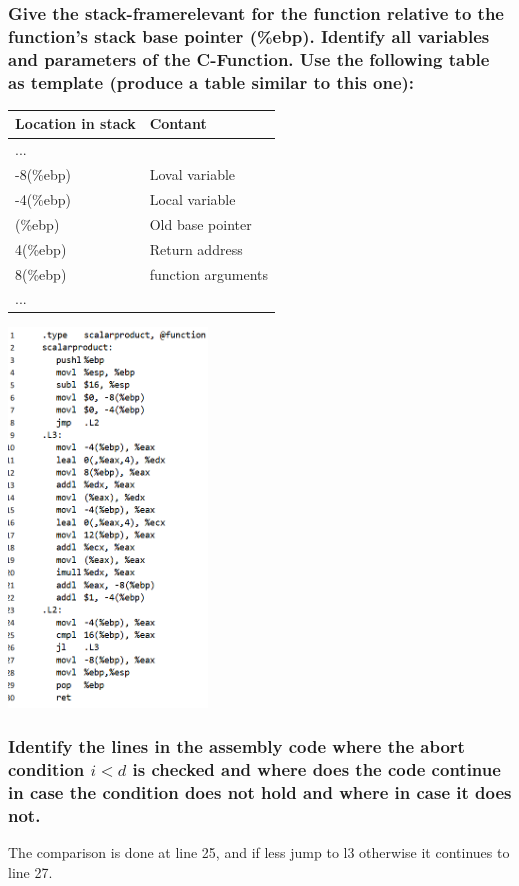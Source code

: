 \documentclass[12pt, a4paper]{article}
\begin{document}
			\subsubsection{Give  the stack-framerelevant for the function relative to the function’s stack base pointer (\%ebp).   Identify   all   variables   and   parameters   of   the   C-Function.   Use   the following table as template (produce a table similar to this one):}
				\begin{table}[h!]
\begin{tabular}{|l|l|}
\hline
\textbf{Location in stack} & \textbf{Contant}   \\ \hline
...                        &                    \\ \hline
-8(\%ebp)                  & Loval variable     \\ \hline
-4(\%ebp)                  & Local variable     \\ \hline
(\%ebp)                    & Old base pointer   \\ \hline
4(\%ebp)                   & Return address     \\ \hline
8(\%ebp)                   & function arguments \\ \hline
...                        &                    \\ \hline
\end{tabular}
\end{table}
			\includegraphics[width=200px]{assets/164a.png}
			\subsubsection{Identify the lines in the assembly code where the abort condition $i < d$ is checked and where does the code continue in case the condition does not hold and where in case it does not.}
				The comparison is done at line 25, and if less jump to l3 otherwise it continues to line 27.
\end{document}
